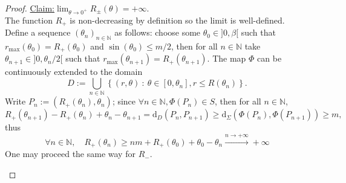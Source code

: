\documentclass[a4paper,12pt]{article}
\def\NN{\mathbb N}
\def\d{\mathrm{d}}
\def\d{\mathrm{d}}
\newenvironment{claim}[1]{\par\noindent\underline{Claim:}\space#1}{}
\theoremstyle{definition}
\begin{document}
\begin{proof}
				\begin{claim}\label{claim:claim_2}{$\lim_{\theta\rightarrow 0^+} R_\pm(\theta)= +\infty$.}
				\end{claim}\\
					The function $R_+$ is non-decreasing by definition so the limit is well-defined. Define a sequence $(\theta_n)_{n\in\NN}$ as follows: choose some $\theta_0\in]0,\beta[$ such that $r_{\max}(\theta_0)=R_+(\theta_0)$ and $\sin(\theta_0)\leq m/2$, then for all $n\in\NN$ take $\theta_{n+1}\in]0,\theta_{n}/2[$ such that $r_{\max}(\theta_{n+1})=R_+(\theta_{n+1})$. The map $\Phi$ can be continuously extended to the domain $$D:=\bigcup_{n\in\NN}\left\{(r,\theta)~:~\theta \in [0,\theta_n], r\leq R(\theta_n)\right\}.$$
					Write $P_n:=(R_+(\theta_n),\theta_n)$; since $\forall n\in\NN,\Phi(P_n)\in S$, then for all $n\in\NN$,
					$$R_+(\theta_{n+1})-R_+(\theta_n)+\theta_n-\theta_{n+1} =\d_D(P_n,P_{n+1})\geq \d_\Sigma(\Phi(P_n),\Phi(P_{n+1}))\geq m,$$ thus 
					$$\forall n\in\NN,\quad R_+(\theta_{n})\geq nm + R_+(\theta_0)+\theta_0-\theta_n\xrightarrow{n\rightarrow +\infty} +\infty$$
					One may proceed the same way for $R_-$.
									\def\sq{0.707106781}
				\def\myrad{6cm}%
				\def\deltarad{1cm}
				\def\deltatheta{7}%
				\def\thetamax{30}
						 \begin{center}
\end{center}
\end{proof}
\end{document}
